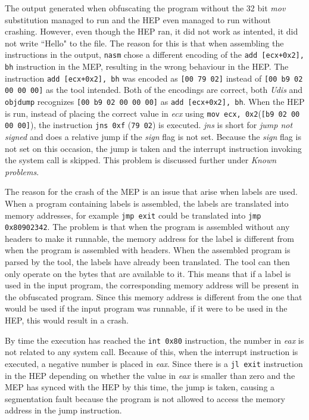 \documentclass[11pt,twoside]{eitExjobb}
\begin{document}
The output generated when obfuscating the program without the 32 bit \emph{mov} substitution managed to run and the HEP even managed to run without crashing. However, even though the HEP ran, it did not work as intented, it did not write ``Hello" to the file. The reason for this is that when assembling the instructions in the output, \texttt{nasm} chose a different encoding of the \texttt{add [ecx+0x2], bh} instruction in the MEP, resulting in the wrong behaviour in the HEP. The instruction \texttt{add [ecx+0x2], bh} was encoded as \texttt{[00 79 02]} instead of \texttt{[00 b9 02 00 00 00]} as the tool intended. Both of the encodings are correct, both \emph{Udis} and \texttt{objdump} recognizes \texttt{[00 b9 02 00 00 00]} as \texttt{add [ecx+0x2], bh}. When the HEP is run, instead of placing the correct value in \emph{ecx} using \texttt{mov ecx, 0x2}(\texttt{[b9 02 00 00 00]}),  the instruction \texttt{jns 0xf} (\texttt{79 02}) is executed. \emph{jns} is short for \emph{jump not signed} and does a relative jump if the \emph{sign} flag is not set. Because the \emph{sign} flag is not set on this occasion, the jump is taken and the interrupt instruction invoking the system call is skipped. This problem is discussed further under \emph{Known problems}.

The reason for the crash of the MEP is an issue that arise when labels are used. When a program containing labels is assembled, the labels are translated into memory addresses, for example \texttt{jmp exit} could be translated into \texttt{jmp 0x80902342}. The problem is that when the program is assembled without any headers to make it runnable, the memory address for the label is different from when the program is assembled with headers. When the assembled program is parsed by the tool, the labels have already been translated. The tool can then only operate on the bytes that are available to it. This means that if a label is used in the input program, the corresponding memory address will be present in the obfuscated program. Since this memory address is different from the one that would be used if the input program was runnable, if it were to be used in the HEP, this would result in a crash. 

By time the execution has reached the \texttt{int 0x80} instruction, the number in \emph{eax} is not related to any system call. Because of this, when the interrupt instruction is executed, a negative number is placed in \emph{eax}. Since there is a \texttt{jl exit} instruction in the HEP depending on whether the value in \emph{eax} is smaller than zero and the MEP has synced with the HEP by this time, the jump is taken, causing a segmentation fault because the program is not allowed to access the memory address in the jump instruction. 
\end{document}
